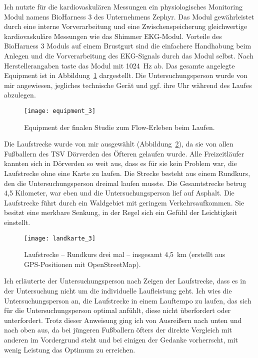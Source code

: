 Ich nutzte für die kardiovaskulären Messungen ein physiologisches Monitoring Modul namens BioHarness 3 des Unternehmens Zephyr. Das Modul gewährleistet durch eine interne Vorverarbeitung und eine Zwischenspeicherung gleichwertige kardiovaskuläre Messungen wie das Shimmer \ac{EKG}-Modul. Vorteile des BioHarness 3 Moduls auf einem Brustgurt sind die einfachere Handhabung beim Anlegen und die Vorverarbeitung des \ac{EKG}-Signals durch das Modul selbst. Nach Herstellerangaben taste das Modul mit 1024~Hz ab. Das gesamte angelegte Equipment ist in Abbildung~\ref{fig:equipment_3} dargestellt. Die Untersuchungsperson wurde von mir angewiesen, jegliches technische Gerät und ggf. ihre Uhr während des Laufes abzulegen. 
\begin{figure}
	[!htb] \centering 
	\texttt{[image: equipment\_3]} \caption[Equipment der finalen Studie zum Flow-Erleben beim Laufen.]{Equipment der finalen Studie zum Flow-Erleben beim Laufen.} \label{fig:equipment_3} 
\end{figure}

Die Laufstrecke wurde von mir ausgewählt (Abbildung~\ref{fig:landkarte_3}), da sie von allen Fußballern des TSV Dörverden des Öfteren gelaufen wurde. Alle Freizeitläufer kannten sich in Dörverden so weit aus, dass es für sie kein Problem war, die Laufstrecke ohne eine Karte zu laufen. Die Strecke besteht aus einem Rundkurs, den die Untersuchungsperson dreimal laufen musste. Die Gesamtstrecke betrug 4,5 Kilometer, war eben und die Untersuchungsperson lief auf Asphalt. Die Laufstrecke führt durch ein Waldgebiet mit geringem Verkehrsaufkommen. Sie besitzt eine merkbare Senkung, in der Regel sich ein Gefühl der Leichtigkeit einstellt. 
\begin{figure}
	[!htb] \centering 
	\texttt{[image: landkarte\_3]} \caption[Laufstrecke -- Rundkurs.]{Laufstrecke -- Rundkurs drei mal -- insgesamt 4,5~km (erstellt aus \acs{GPS}-Positionen mit OpenStreetMap).} \label{fig:landkarte_3} 
\end{figure}

Ich erläuterte der Untersuchungsperson nach Zeigen der Laufstrecke, dass es in der Untersuchung nicht um die individuelle Laufleistung geht. Ich wies die Untersuchungsperson an, die Laufstrecke in einem Lauftempo zu laufen, das sich für die Untersuchungsperson optimal anfühlt, diese nicht überfordert oder unterfordert. Trotz dieser Anweisung ging ich von Ausreißern nach unten und nach oben aus, da bei jüngeren Fußballern öfters der direkte Vergleich mit anderen im Vordergrund steht und bei einigen der Gedanke vorherrscht, mit wenig Leistung das Optimum zu erreichen. 

